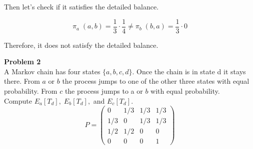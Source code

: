 \documentclass[12pt]{article}
\begin{document}
\begin{enumerate}[label=(\alph*)]
\vspace{1.5\baselineskip}
Then let's check if it satisfies the detailed balance. 

$$\pi_a\;(a,b) = \frac{1}{3}\cdot \frac{1}{4} \neq \pi_b\;(b,a) = \frac{1}{3}\cdot 0$$

\vspace{1.5\baselineskip}
Therefore, it does not satisfy the detailed balance.
\end{enumerate}


\newpage
\textbf{Problem 2}\\
A Markov chain has four states $\{a,b,c,d\}$. Once the chain is in state d it stays there. From $a$ or $b$ the process jumps to one of the other three states with equal probability. From $c$ the process jumps to a or $b$ with equal probability.\\
Compute $E_a[T_d],\; E_b[T_d],$ and $E_c[T_d]$.
$$P=
\begin{pmatrix}
0&1/3&1/3&1/3\\
1/3&0&1/3&1/3\\
1/2&1/2&0&0\\
0&0&0&1
\end{pmatrix}$$

\vspace{1.5\baselineskip}
\end{document}

